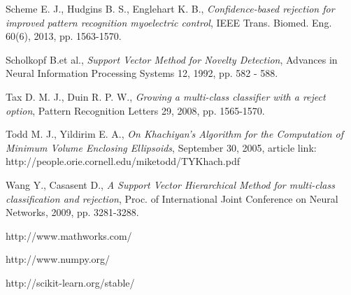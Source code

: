 \documentclass{llncs}
\begin{document}
\begin{thebibliography}{1}
Scheme E. J., Hudgins B. S., Englehart K. B., \emph{Confidence-based rejection for improved pattern recognition myoelectric control}, IEEE Trans. Biomed. Eng. 60(6), 2013, pp. 1563-1570.

Scholkopf B.et al., \emph{Support Vector Method for Novelty Detection}, Advances in Neural Information Processing Systems 12, 1992, pp. 582 - 588. 

Tax D. M. J., Duin R. P. W., \emph{Growing a multi-class classifier with a reject option}, Pattern Recognition Letters 29, 2008, pp. 1565-1570.

Todd M. J., Yildirim E. A., \emph{On Khachiyan's Algorithm for the Computation of Minimum Volume Enclosing Ellipsoids}, September 30, 2005, article link: http://people.orie.cornell.edu/miketodd/TYKhach.pdf

Wang Y., Casasent D., \emph{A Support Vector Hierarchical Method for multi-class classification and rejection}, Proc. of International Joint Conference on Neural Networks, 2009, pp. 3281-3288.

http://www.mathworks.com/

http://www.numpy.org/

http://scikit-learn.org/stable/

	

 
\end{thebibliography}
\end{document}
